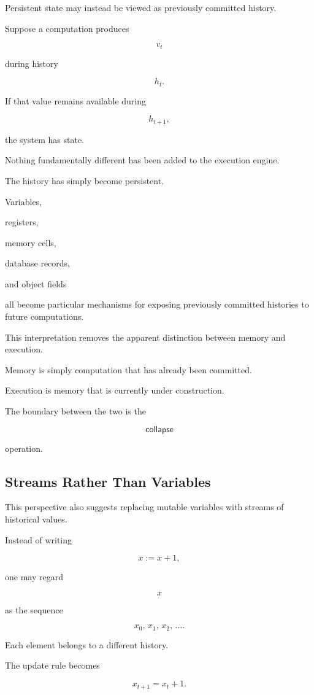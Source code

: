 \documentclass[12pt,oneside]{article}
\newcommand{\Collapse}{\mathsf{collapse}}
\begin{document}
Persistent state may instead be viewed as previously committed history.

Suppose a computation produces

\[
v_t
\]

during history

\[
h_t.
\]

If that value remains available during

\[
h_{t+1},
\]

the system has state.

Nothing fundamentally different has been added to the execution engine.

The history has simply become persistent.

Variables,

registers,

memory cells,

database records,

and object fields

all become particular mechanisms for exposing previously committed histories to future computations.

This interpretation removes the apparent distinction between memory and execution.

Memory is simply computation that has already been committed.

Execution is memory that is currently under construction.

The boundary between the two is the

\[
\Collapse
\]

operation.

\subsection{Streams Rather Than Variables}

This perspective also suggests replacing mutable variables with streams of historical values.

Instead of writing

\[
x := x+1,
\]

one may regard

\[
x
\]

as the sequence

\[
x_0,\,
x_1,\,
x_2,\,
\ldots.
\]

Each element belongs to a different history.

The update rule becomes

\[
x_{t+1}
=
x_t+1.
\]
\end{document}
